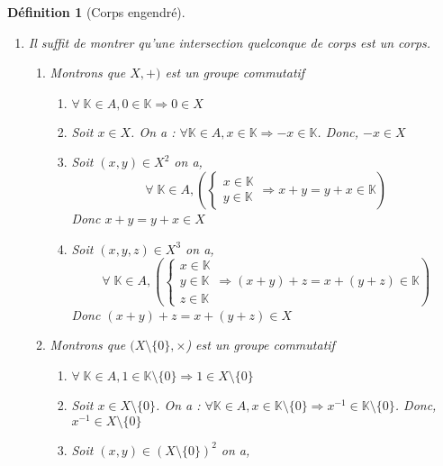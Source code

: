 \documentclass[a4paper,12pt,french]{report}
\newtheorem{definition}{Définition}[section]
\begin{document}
\begin{definition}[Corps engendré]
\begin{preuve}
		\begin{enumerate}
			\item{} Il suffit de montrer qu'une intersection quelconque de corps est un corps.
			\begin{enumerate}
				\item Montrons que \(X,+)\) est un groupe commutatif
					\begin{enumerate}
							\item 
								\( \forall\; \mathbb{K} \in A , 0 \in \mathbb{K} \Rightarrow 0 \in X \){}
							\item 
								Soit \(x \in X \). On a : \(\forall \mathbb{K} \in A, x\in \mathbb{K} \Rightarrow -x \in \mathbb{K} \). Donc, \(-x \in X\){}
							\item 
								Soit \((x,y) \in X^{2} \) on a, 
								\[{}
								\forall \; \mathbb{K} \in A , 
								\left(
								\left\{
								\begin{array}{ll}
									x\in \mathbb{K}\\
									y\in \mathbb{K}
								\end{array}
								\right. \Rightarrow x+y = y+x \in \mathbb{K} \right){}
								\]
								Donc \(x + y = y+x \in X \){}
							\item 
								Soit \((x,y,z) \in X^{3} \) on a, 
								\[{}
								\forall \; \mathbb{K} \in A , 
								\left(
								\left\{
								\begin{array}{lll}
									x\in \mathbb{K}\\
									y\in \mathbb{K}\\
									z\in \mathbb{K}
								\end{array}
								\right. \Rightarrow (x+y)+z = x+(y+z) \in \mathbb{K} \right){}
								\]
								Donc \((x + y)+z = x+(y+z) \in X \){}
					\end{enumerate}
				\item Montrons que \((X\setminus\{0\},\times\)) est un groupe commutatif
					\begin{enumerate}
							\item 
								\( \forall\; \mathbb{K} \in A , 1 \in \mathbb{K}\setminus\{0\} \Rightarrow 1 \in X\setminus\{0\} \){}
							\item 
								Soit \(x \in X\setminus\{0\} \). On a : \(\forall \mathbb{K} \in A, x\in \mathbb{K}\setminus\{0\} \Rightarrow x^{-1} \in \mathbb{K}\setminus\{0\} \). Donc, \(x^{-1} \in X\setminus\{0\}\){}
							\item 
								Soit \((x,y) \in (X\setminus\{0\})^{2} \) on a, 

\end{enumerate}
\end{enumerate}
\end{enumerate}
\end{preuve}
\end{definition}
\end{document}
